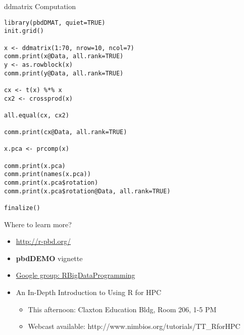 \begin{frame}
  \begin{block}{ddmatrix Computation}\pause
    \vspace{-1ex}
    \begin{lstlisting}[title=pbdRddmatrix.R "being parallel",basicstyle=\tiny]
library(pbdDMAT, quiet=TRUE)
init.grid()

x <- ddmatrix(1:70, nrow=10, ncol=7)
comm.print(x@Data, all.rank=TRUE)
y <- as.rowblock(x)
comm.print(y@Data, all.rank=TRUE)

cx <- t(x) %*% x
cx2 <- crossprod(x)

all.equal(cx, cx2)

comm.print(cx@Data, all.rank=TRUE)

x.pca <- prcomp(x)

comm.print(x.pca)
comm.print(names(x.pca))
comm.print(x.pca$rotation)
comm.print(x.pca$rotation@Data, all.rank=TRUE)

finalize()
    \end{lstlisting}
  \end{block}
\end{frame}


\begin{frame}
  \begin{block}{Where to learn more?}
  \begin{itemize}
    \item \url{http://r-pbd.org/}
    \item \textbf{pbdDEMO} vignette
    \item \url{Google group: RBigDataProgramming}
    \item An In-Depth Introduction to Using R for HPC
      \begin{itemize}
      \item This afternoon: Claxton Education Bldg, Room 206, 1-5 PM
      \item Webcast available: http://www.nimbios.org/tutorials/TT\_RforHPC
      \end{itemize}
    \end{itemize}
  \end{block}
\end{frame}
